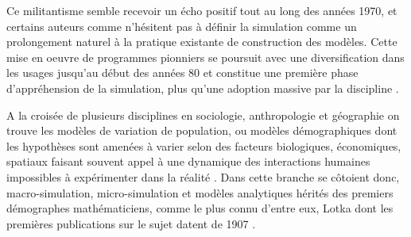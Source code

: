 Ce militantisme semble recevoir un écho positif tout au long des années 1970, et certains auteurs comme \textcite[38]{Whallon1972} n'hésitent pas à définir la simulation comme un prolongement naturel à la pratique existante de construction des modèles. Cette mise en oeuvre de programmes pionniers se poursuit avec une diversification dans les usages jusqu'au début des années 80 et constitue une première phase d'appréhension de la simulation, plus qu'une adoption massive par la discipline \autocite{Lake2013}.



A la croisée de plusieurs disciplines en sociologie, anthropologie et géographie on trouve les modèles de variation de population, ou modèles démographiques dont les hypothèses sont amenées à varier selon des facteurs biologiques, économiques, spatiaux faisant souvent appel à une dynamique des interactions humaines impossibles à expérimenter dans la réalité . Dans cette branche se côtoient donc, macro-simulation, micro-simulation et modèles analytiques hérités des premiers démographes mathématiciens, comme le plus connu d'entre eux, Lotka dont les premières publications sur le sujet datent de 1907 \autocite[355]{Veron2009}.


